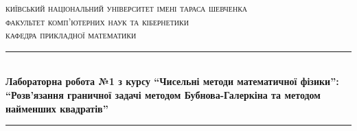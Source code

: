 
\setlength\parindent{0pt} %



\begin{titlepage}

\newcommand{\HRule}{\rule{\linewidth}{0.5mm}} %

\center %
 

\textsc{\Large київський національний університет імені тараса шевченка}\\[1.5cm] %
\textsc{\large факультет комп'ютерних наук та кібернетики}\\[0.5cm] %
\textsc{\large кафедра прикладної математики}\\[0.5cm] %


\HRule \\[0.4cm]
{ \Large \bfseries Лабораторна робота №1 з курсу “Чисельні методи математичної фізики”:}\\[0.4cm] %
{ \Large \bfseries “Розв'язання граничної задачі методом Бубнова-Галеркіна та методом найменших квадратів” }
\HRule \\[1.5cm]
 


\end{titlepage}
